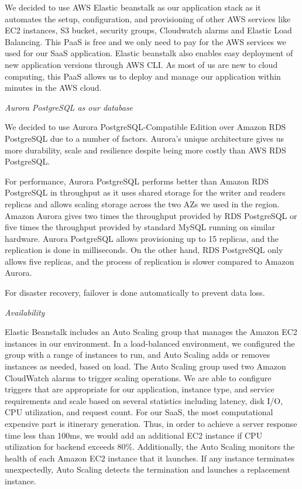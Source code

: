 \documentclass[12pt,a4paper]{article}
\begin{document}
            We decided to use AWS Elastic beanstalk as our application stack as it automates the setup, configuration, and provisioning of other AWS services like EC2 instances, S3 bucket, security groups, Cloudwatch alarms and Elastic Load Balancing. This PaaS is free and we only need to pay for the AWS services we used for our SaaS application. Elastic beanstalk also enables easy deployment of new application versions through AWS CLI. As most of us are new to cloud computing, this PaaS allows us to deploy and manage our application within minutes in the AWS cloud.
            
            \textit{Aurora PostgreSQL as our database}
            
            We decided to use Aurora PostgreSQL-Compatible Edition over Amazon RDS PostgreSQL due to a number of factors. Aurora's unique architecture gives us more durability, scale and resilience despite being more costly than AWS RDS PostgreSQL.

            For performance, Aurora PostgreSQL performs better than Amazon RDS PostgreSQL in throughput as it uses shared storage for the writer and readers replicas and allows scaling storage across the two AZs we used in the region. Amazon Aurora gives two times the throughput provided by RDS PostgreSQL or five times the throughput provided by standard MySQL running on similar hardware. Aurora PostgreSQL allows provisioning up to 15 replicas, and the replication is done in milliseconds. On the other hand, RDS PostgreSQL only allows five replicas, and the process of replication is slower compared to Amazon Aurora.
            
            For disaster recovery,  failover is done automatically to prevent data loss.
            
            \textit{Availability}
            
            Elastic Beanstalk includes an Auto Scaling group that manages the Amazon EC2 instances in our environment. In a load-balanced environment, we configured the group with a range of instances to run, and Auto Scaling adds or removes instances as needed, based on load. The Auto Scaling group used two Amazon CloudWatch alarms to trigger scaling operations. We are able to configure triggers that are appropriate for our application, instance type, and service requirements and scale based on several statistics including latency, disk I/O, CPU utilization, and request count. For our SaaS, the most computational expensive part is itinerary generation. Thus, in order to achieve a server response time less than 100ms, we would add an additional EC2 instance if CPU utilization for backend exceeds 80\%. Additionally, the Auto Scaling monitors the health of each Amazon EC2 instance that it launches. If any instance terminates unexpectedly, Auto Scaling detects the termination and launches a replacement instance.
\end{document}
